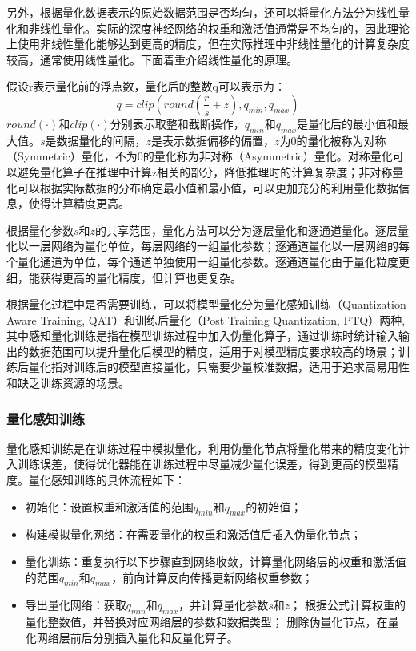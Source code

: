 另外，根据量化数据表示的原始数据范围是否均匀，还可以将量化方法分为线性量化和非线性量化。实际的深度神经网络的权重和激活值通常是不均匀的，因此理论上使用非线性量化能够达到更高的精度，但在实际推理中非线性量化的计算复杂度较高，通常使用线性量化。下面着重介绍线性量化的原理。

假设r表示量化前的浮点数，量化后的整数q可以表示为：
    \begin{equation}
        q=clip(round(\frac{r}{s}+z),q_{min},q_{max})
    \end{equation}
$round(\cdot)$和$clip(\cdot)$分别表示取整和截断操作，$q_{min}$和$q_{max}$是量化后的最小值和最大值。$s$是数据量化的间隔，$z$是表示数据偏移的偏置，$z$为0的量化被称为对称（Symmetric）量化，不为0的量化称为非对称（Asymmetric）量化。对称量化可以避免量化算子在推理中计算z相关的部分，降低推理时的计算复杂度；非对称量化可以根据实际数据的分布确定最小值和最小值，可以更加充分的利用量化数据信息，使得计算精度更高。

根据量化参数$s$和$z$的共享范围，量化方法可以分为逐层量化和逐通道量化。逐层量化以一层网络为量化单位，每层网络的一组量化参数；逐通道量化以一层网络的每个量化通道为单位，每个通道单独使用一组量化参数。逐通道量化由于量化粒度更细，能获得更高的量化精度，但计算也更复杂。

根据量化过程中是否需要训练，可以将模型量化分为量化感知训练（Quantization Aware Training, QAT）和训练后量化（Post Training Quantization, PTQ）两种,其中感知量化训练是指在模型训练过程中加入伪量化算子，通过训练时统计输入输出的数据范围可以提升量化后模型的精度，适用于对模型精度要求较高的场景；训练后量化指对训练后的模型直接量化，只需要少量校准数据，适用于追求高易用性和缺乏训练资源的场景。
    
\subsubsection{量化感知训练}

量化感知训练是在训练过程中模拟量化，利用伪量化节点将量化带来的精度变化计入训练误差，使得优化器能在训练过程中尽量减少量化误差，得到更高的模型精度。量化感知训练的具体流程如下：
 \begin{itemize}
    \item 初始化：设置权重和激活值的范围$q_{min}$和$q_{max}$的初始值；
    \item 构建模拟量化网络：在需要量化的权重和激活值后插入伪量化节点；
    \item 量化训练：重复执行以下步骤直到网络收敛，计算量化网络层的权重和激活值的范围$q_{min}$和$q_{max}$，前向计算反向传播更新网络权重参数；
    \item 导出量化网络：获取$q_{min}$和$q_{max}$，并计算量化参数$s$和$z$；
    根据公式计算权重的量化整数值，并替换对应网络层的参数和数据类型；
    删除伪量化节点，在量化网络层前后分别插入量化和反量化算子。
\end{itemize}

